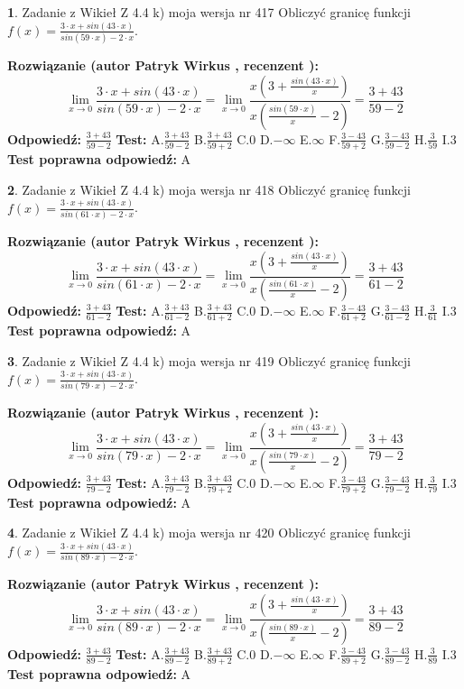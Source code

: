 \documentclass[12pt, a4paper]{article}
\theoremstyle{definition} %
\newtheorem{zad}{}
\newcommand{\zadStart}[1]{\begin{zad}#1\newline}
\newcommand{\zadStop}{\end{zad}}
\newcommand{\rozwStart}[2]{\noindent \textbf{Rozwiązanie (autor #1 , recenzent #2): }\newline}
\newcommand{\rozwStop}{\newline}
\newcommand{\odpStart}{\noindent \textbf{Odpowiedź:}\newline}
\newcommand{\odpStop}{\newline}
\newcommand{\testStart}{\noindent \textbf{Test:}\newline}
\newcommand{\testStop}{\newline}
\newcommand{\kluczStart}{\noindent \textbf{Test poprawna odpowiedź:}\newline}
\newcommand{\kluczStop}{\newline}
\begin{document}
\zadStart{Zadanie z Wikieł Z 4.4 k) moja wersja nr 417}
Obliczyć granicę funkcji $f(x)=\frac{3\cdot x +sin(43\cdot x)}{sin(59\cdot x) -2\cdot x}$.
\zadStop
\rozwStart{Patryk Wirkus}{}
$$\lim\limits_{x\to 0}\frac{3\cdot x +sin(43\cdot x)}{sin(59\cdot x) -2\cdot x}
=\lim\limits_{x\to 0}\frac{x(3+\frac{sin(43\cdot x)}{x})}{x(\frac{sin(59\cdot x)}{x}-2)}
=\frac{3+43}{59-2}$$
\rozwStop
\odpStart
$\frac{3+43}{59-2}$
\odpStop
\testStart
A.$\frac{3+43}{59-2}$
B.$\frac{3+43}{59+2}$
C.$0$
D.$-\infty$
E.$\infty$
F.$\frac{3-43}{59+2}$
G.$\frac{3-43}{59-2}$
H.$\frac{3}{59}$
I.$3$
\testStop
\kluczStart
A
\kluczStop



\zadStart{Zadanie z Wikieł Z 4.4 k) moja wersja nr 418}
Obliczyć granicę funkcji $f(x)=\frac{3\cdot x +sin(43\cdot x)}{sin(61\cdot x) -2\cdot x}$.
\zadStop
\rozwStart{Patryk Wirkus}{}
$$\lim\limits_{x\to 0}\frac{3\cdot x +sin(43\cdot x)}{sin(61\cdot x) -2\cdot x}
=\lim\limits_{x\to 0}\frac{x(3+\frac{sin(43\cdot x)}{x})}{x(\frac{sin(61\cdot x)}{x}-2)}
=\frac{3+43}{61-2}$$
\rozwStop
\odpStart
$\frac{3+43}{61-2}$
\odpStop
\testStart
A.$\frac{3+43}{61-2}$
B.$\frac{3+43}{61+2}$
C.$0$
D.$-\infty$
E.$\infty$
F.$\frac{3-43}{61+2}$
G.$\frac{3-43}{61-2}$
H.$\frac{3}{61}$
I.$3$
\testStop
\kluczStart
A
\kluczStop



\zadStart{Zadanie z Wikieł Z 4.4 k) moja wersja nr 419}
Obliczyć granicę funkcji $f(x)=\frac{3\cdot x +sin(43\cdot x)}{sin(79\cdot x) -2\cdot x}$.
\zadStop
\rozwStart{Patryk Wirkus}{}
$$\lim\limits_{x\to 0}\frac{3\cdot x +sin(43\cdot x)}{sin(79\cdot x) -2\cdot x}
=\lim\limits_{x\to 0}\frac{x(3+\frac{sin(43\cdot x)}{x})}{x(\frac{sin(79\cdot x)}{x}-2)}
=\frac{3+43}{79-2}$$
\rozwStop
\odpStart
$\frac{3+43}{79-2}$
\odpStop
\testStart
A.$\frac{3+43}{79-2}$
B.$\frac{3+43}{79+2}$
C.$0$
D.$-\infty$
E.$\infty$
F.$\frac{3-43}{79+2}$
G.$\frac{3-43}{79-2}$
H.$\frac{3}{79}$
I.$3$
\testStop
\kluczStart
A
\kluczStop



\zadStart{Zadanie z Wikieł Z 4.4 k) moja wersja nr 420}
Obliczyć granicę funkcji $f(x)=\frac{3\cdot x +sin(43\cdot x)}{sin(89\cdot x) -2\cdot x}$.
\zadStop
\rozwStart{Patryk Wirkus}{}
$$\lim\limits_{x\to 0}\frac{3\cdot x +sin(43\cdot x)}{sin(89\cdot x) -2\cdot x}
=\lim\limits_{x\to 0}\frac{x(3+\frac{sin(43\cdot x)}{x})}{x(\frac{sin(89\cdot x)}{x}-2)}
=\frac{3+43}{89-2}$$
\rozwStop
\odpStart
$\frac{3+43}{89-2}$
\odpStop
\testStart
A.$\frac{3+43}{89-2}$
B.$\frac{3+43}{89+2}$
C.$0$
D.$-\infty$
E.$\infty$
F.$\frac{3-43}{89+2}$
G.$\frac{3-43}{89-2}$
H.$\frac{3}{89}$
I.$3$
\testStop
\kluczStart
A
\kluczStop
\end{document}
